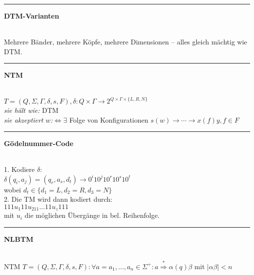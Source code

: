 \documentclass{article}
\newcommand{\hh}[1]{{\vspace{1pt}\hrule\vspace{1pt} \noindent\textbf{#1}}\\}
\newcommand{\hhh}[1]{{\vspace{1pt}\noindent\emph{#1:}}}
\begin{document}
\begin{multicols}{4}
\hh{DTM-Varianten}
Mehrere Bänder, mehrere Köpfe, mehrere Dimensionen -- alles gleich mächtig wie DTM.

\hh{NTM}
$T=(Q, \Sigma, \Gamma, \delta, s, F ), \delta: Q\times\Gamma\to 2^{Q\times\Gamma\times\{L, R, N\}}$\\
\hhh{sie hält wie} DTM\\
\hhh{sie akzeptiert $w$}$\Leftrightarrow\exists$ Folge von Konfigurationen $s(w)\to\cdots\to x(f)y, f\in F$\\ 

\hh{Gödelnummer-Code}
1. Kodiere $\delta$: \\
$\delta(q_i,a_j)=(q_r,a_s,d_t) \to 0^i10^j10^r10^s10^t$ \\
wobei $d_t\in \{d_1=L, d_2=R, d_3=N\}$ \\
2. Die TM wird dann kodiert durch: \\
			$111u_1 11u_211...11u_z111$ \\
			mit $u_i$ die möglichen Übergänge in bel. Reihenfolge. \\

\hh{NLBTM}
NTM $T=(Q, \Sigma, \Gamma, \delta, s, F): \forall a=a_1,\ldots, a_n\in\Sigma^+:a\stackrel{*}{\Rightarrow}\alpha(q)\beta$ mit $|\alpha\beta|<n$


\end{multicols}
\end{document}
